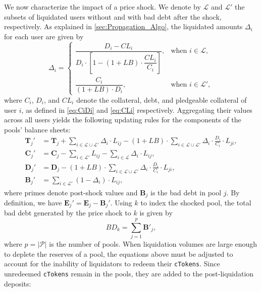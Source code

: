 \documentclass[a4paper,UKenglish,cleveref, autoref, thm-restate]{informs3}
\begin{document}
We now characterize the impact of a price shock. We denote by \(\mathcal{L}\) and \(\mathcal{L}'\) the subsets of liquidated users without and with bad debt after the shock, respectively. As explained in \autoref{sec:Propagation_Algo}, the liquidated amounts $\Delta_i$ for each user are given by
\begin{equation*}
    \Delta_i =
    \begin{cases}
        \dfrac{D_i - CL_i}{D_i \cdot \left[1 - (1+LB)\cdot \dfrac{CL_i}{C_i}\right]}, & \text{when } i \in \mathcal{L},\\[6pt]
        \dfrac{C_i}{(1+LB)\cdot D_i}, & \text{when } i \in \mathcal{L}',
    \end{cases}
\end{equation*}
where \(C_i\), \(D_i\), and $CL_i$ denote the collateral, debt, and pledgeable collateral of user \(i\), as defined in \eqref{eq:CiDi} and \eqref{eq:CLi} respectively. Aggregating their values across all users yields the following updating rules for the components of the pools' balance sheets:
\begin{align*}
    \mathbf{T}_j' &= \mathbf{T}_j + \sum_{i\in \mathcal{L} \cup \mathcal{L}'} \Delta_i \cdot L_{ij} - (1 + LB)\cdot\sum_{i\in \mathcal{L} \cup \mathcal{L}'} \Delta_i\cdot \frac{D_i}{C_i}\cdot L_{ji},\\
    \mathbf{C}_j' &= \mathbf{C}_j - \sum_{i\in \mathcal{L}'}L_{ij} - \sum_{i\in \mathcal{L}} \Delta_i \cdot L_{ij},\\
    \mathbf{D}_j' &= \mathbf{D}_j - (1 + LB)\cdot \sum_{i\in \mathcal{L}\cup\mathcal{L}'} \Delta_i \cdot \frac{D_i}{C_i}\cdot L_{ji},\\
    \mathbf{B}_j' &= \sum_{i\in \mathcal{L}'}  (1 - \Delta_i)\cdot L_{ij},
\end{align*}
where primes denote post-shock values and $\mathbf{B}_j$ is the bad debt in pool $j$. By definition, we have \(\mathbf{E}_j' = \mathbf{E}_j - \mathbf{B}_j'\). Using \(k\) to index the shocked pool, the total bad debt generated by the price shock to \(k\) is given by
\begin{equation}
\label{eq:Def_BD}
    BD_k = \sum_{j=1}^p \mathbf{B}'_j,
\end{equation}
where $p=|\mathcal{P}|$ is the number of pools. When liquidation volumes are large enough to deplete the reserves of a pool, the equations above must be adjusted to account for the inability of liquidators to redeem their \texttt{cTokens}. Since unredeemed \texttt{cTokens} remain in the pools, they are added to the post-liquidation deposits:
\end{document}

